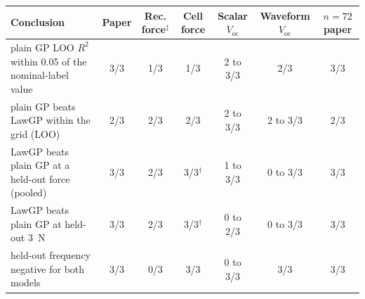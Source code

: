 \begin{tabular}{l cccccc}
\toprule
Conclusion & Paper & Rec. force$^\ddagger$ & Cell force & Scalar $V_\mathrm{oc}$ & Waveform $V_\mathrm{oc}$ & $n=72$ paper \\
\midrule
plain GP LOO $R^2$ within 0.05 of the nominal-label value & 3/3 & 1/3 & 1/3 & 2 to 3/3 & 2/3 & 3/3 \\
plain GP beats LawGP within the grid (LOO) & 2/3 & 2/3 & 2/3 & 2 to 3/3 & 2 to 3/3 & 2/3 \\
LawGP beats plain GP at a held-out force (pooled) & 3/3 & 2/3 & 3/3$^\dagger$ & 1 to 3/3 & 0 to 3/3 & 3/3 \\
LawGP beats plain GP at held-out \SI{3}{\newton} & 3/3 & 2/3 & 3/3$^\dagger$ & 0 to 2/3 & 0 to 3/3 & 3/3 \\
held-out frequency negative for both models & 3/3 & 0/3 & 3/3 & 0 to 3/3 & 3/3 & 3/3 \\
\bottomrule
\end{tabular}
